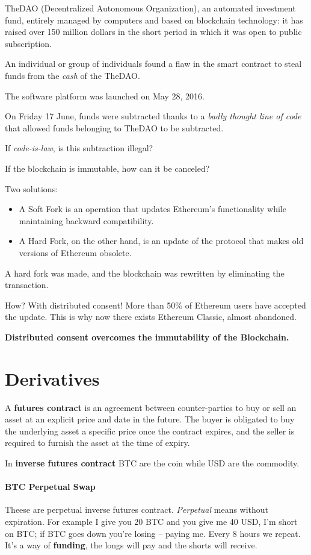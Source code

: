 TheDAO (Decentralized Autonomous Organization), an automated investment fund, entirely managed by computers and based on blockchain technology: it has raised over 150 million dollars in the short period in which it was open to public subscription.

An individual or group of individuals found a flaw in the smart contract to steal funds from the \textit{cash} of the TheDAO.

The software platform was launched on May 28, 2016.

On Friday 17 June, funds were subtracted thanks to a \textit{badly thought line of code} that allowed funds belonging to TheDAO to be subtracted.

If \textit{code-is-law}, is this subtraction illegal?

If the blockchain is immutable, how can it be canceled?

Two solutions:
\begin{itemize}
	\item A Soft Fork is an operation that updates Ethereum's functionality while maintaining backward compatibility.
	\item A Hard Fork, on the other hand, is an update of the protocol that makes old versions of Ethereum obsolete.
\end{itemize}

A hard fork was made, and the blockchain was rewritten by eliminating the transaction.

How? With distributed consent! More than 50\% of Ethereum users have accepted the update. This is why now there exists Ethereum Classic, almost abandoned.

\textbf{Distributed consent overcomes the immutability of the Blockchain.}

\section{Derivatives}

A \textbf{futures contract} is an agreement between counter-parties to buy or sell an asset at an explicit price and date in the future. The buyer is obligated to buy the underlying asset a specific price once the contract expires, and the seller is required to furnish the asset at the time of expiry.

In \textbf{inverse futures contract} BTC are the coin while USD are the commodity.

\paragraph{BTC Perpetual Swap} Theese are perpetual inverse futures contract. \emph{Perpetual} means without expiration. For example I give you 20 BTC and you give me 40 USD, I'm short on BTC; if BTC goes down you're losing -- paying me. Every 8 hours we repeat. It's a way of \textbf{funding}, the longs will pay and the shorts will receive.

